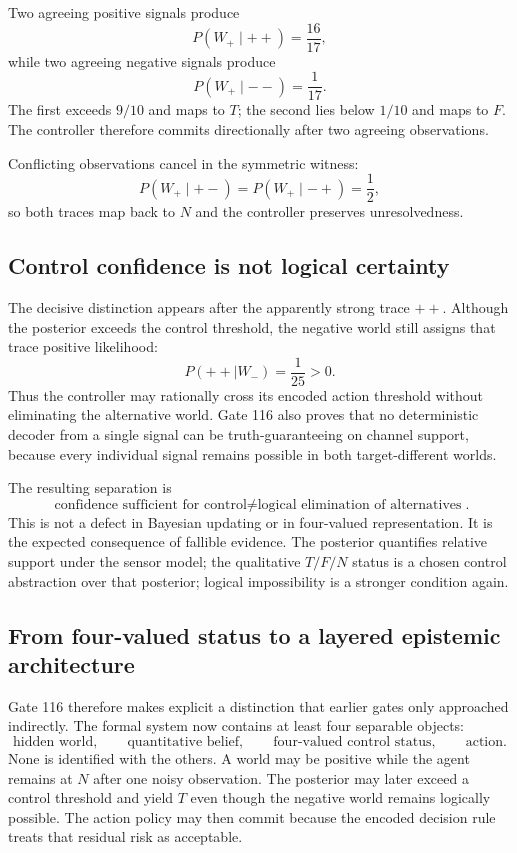 Two agreeing positive signals produce
\[
P(W_+\mid ++)=\frac{16}{17},
\]
while two agreeing negative signals produce
\[
P(W_+\mid --)=\frac1{17}.
\]
The first exceeds $9/10$ and maps to $T$; the second lies below $1/10$ and maps to $F$. The controller therefore commits directionally after two agreeing observations.

Conflicting observations cancel in the symmetric witness:
\[
P(W_+\mid +-)=P(W_+\mid -+)=\frac12,
\]
so both traces map back to $N$ and the controller preserves unresolvedness.

\subsection{Control confidence is not logical certainty}

The decisive distinction appears after the apparently strong trace $++$. Although the posterior exceeds the control threshold, the negative world still assigns that trace positive likelihood:
\[
P(++\mid W_-)=\frac1{25}>0.
\]
Thus the controller may rationally cross its encoded action threshold without eliminating the alternative world. Gate 116 also proves that no deterministic decoder from a single signal can be truth-guaranteeing on channel support, because every individual signal remains possible in both target-different worlds.

The resulting separation is
\[
\boxed{
\text{confidence sufficient for control}
\neq
\text{logical elimination of alternatives}
}.
\]
This is not a defect in Bayesian updating or in four-valued representation. It is the expected consequence of fallible evidence. The posterior quantifies relative support under the sensor model; the qualitative $T/F/N$ status is a chosen control abstraction over that posterior; logical impossibility is a stronger condition again.

\subsection{From four-valued status to a layered epistemic architecture}

Gate 116 therefore makes explicit a distinction that earlier gates only approached indirectly. The formal system now contains at least four separable objects:
\[
\text{hidden world},
\qquad
\text{quantitative belief},
\qquad
\text{four-valued control status},
\qquad
\text{action}.
\]
None is identified with the others. A world may be positive while the agent remains at $N$ after one noisy observation. The posterior may later exceed a control threshold and yield $T$ even though the negative world remains logically possible. The action policy may then commit because the encoded decision rule treats that residual risk as acceptable.

